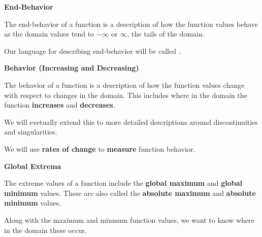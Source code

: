 \documentclass{ximera}
\begin{document}
\begin{explanation}  \textbf{\textcolor{red!75!green}{End-Behavior}} 

The end-behavior of a function is a description of how the function values behave as the domain values tend to $-\infty$ or $\infty$, the tails of the domain. 


Our language for describing end-behavior will be called .

\end{explanation}









\begin{explanation}  \textbf{\textcolor{red!75!green}{Behavior (Increasing and Decreasing)}} 

The behavior of a function is a description of how the function values change with respect to changes in the domain.  This includes where in the domain the function \textbf{\textcolor{purple!85!blue}{increases}} and \textbf{\textcolor{purple!85!blue}{decreases}}. 


We will evetually extend this to more detailed descriptions around discontinuities and singularities.


We will use \textbf{rates of change} to \textbf{measure} function behavior.

\end{explanation}









\begin{explanation}  \textbf{\textcolor{red!75!green}{Global Extrema}} 

The extreme values of a function include the \textbf{\textcolor{purple!85!blue}{global maximum}} and \textbf{\textcolor{purple!85!blue}{global minimum}} values. These are also called the \textbf{\textcolor{purple!85!blue}{absolute maximum}} and \textbf{\textcolor{purple!85!blue}{absolute minimum}} values.  



Along with the maximum and minmum function values, we want to know where in the domain these occur.


\end{explanation}
\end{document}
